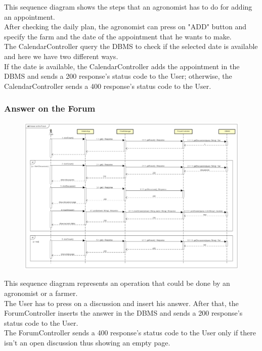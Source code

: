 This sequence diagram shows the steps that an agronomist has to do for adding an appointment.\\
After checking the daily plan, the agronomist can press on "ADD" button and specify the farm and the date 
of the appointment that he wants to make.\\
The CalendarController query the DBMS to check if the selected date is available and here we have two different ways.\\
If the date is available, the CalendarController adds the appointment in the DBMS and sends a 200 response's status code to the User;
otherwise, the CalendarController sends a 400 response's status code to the User.


\newpage
\subsubsection{Answer on the Forum}

\begin{figure}[H]
    \begin{center}
        \includegraphics[width=\textwidth]{Images/SequenceDiagrams/AnswerForumDD.png}
    \end{center}
\end{figure}

This sequence diagram represents an operation that could be done by an agronomist or a farmer.\\
The User has to press on a discussion and insert his answer. After that, the ForumController inserts the answer in the DBMS
and sends a 200 response's status code to the User.\\
The ForumController sends a 400 response's status code to the User only if there isn't an open discussion thus showing an empty page.


